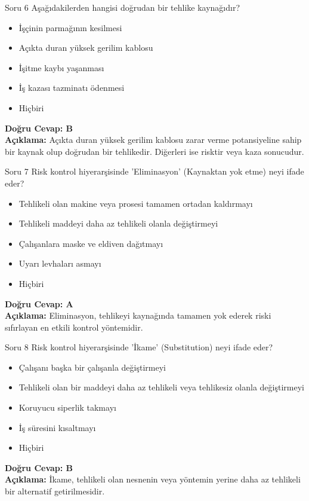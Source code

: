 \documentclass[12pt,a4paper]{article}
\begin{document}
\begin{testcard}{Soru 6}
    Aşağıdakilerden hangisi doğrudan bir tehlike kaynağıdır?
    \begin{itemize}
        \item[A)] İşçinin parmağının kesilmesi
        \item[B)] Açıkta duran yüksek gerilim kablosu
        \item[C)] İşitme kaybı yaşanması
        \item[D)] İş kazası tazminatı ödenmesi
        \item[E)] Hiçbiri
    \end{itemize}
    \tcblower
    \textbf{Doğru Cevap: B} \\
    \textbf{Açıklama:} Açıkta duran yüksek gerilim kablosu zarar verme potansiyeline sahip bir kaynak olup doğrudan bir tehlikedir. Diğerleri ise risktir veya kaza sonucudur.
\end{testcard}

\begin{testcard}{Soru 7}
    Risk kontrol hiyerarşisinde 'Eliminasyon' (Kaynaktan yok etme) neyi ifade eder?
    \begin{itemize}
        \item[A)] Tehlikeli olan makine veya prosesi tamamen ortadan kaldırmayı
        \item[B)] Tehlikeli maddeyi daha az tehlikeli olanla değiştirmeyi
        \item[C)] Çalışanlara maske ve eldiven dağıtmayı
        \item[D)] Uyarı levhaları asmayı
        \item[E)] Hiçbiri
    \end{itemize}
    \tcblower
    \textbf{Doğru Cevap: A} \\
    \textbf{Açıklama:} Eliminasyon, tehlikeyi kaynağında tamamen yok ederek riski sıfırlayan en etkili kontrol yöntemidir.
\end{testcard}

\begin{testcard}{Soru 8}
    Risk kontrol hiyerarşisinde 'İkame' (Substitution) neyi ifade eder?
    \begin{itemize}
        \item[A)] Çalışanı başka bir çalışanla değiştirmeyi
        \item[B)] Tehlikeli olan bir maddeyi daha az tehlikeli veya tehlikesiz olanla değiştirmeyi
        \item[C)] Koruyucu siperlik takmayı
        \item[D)] İş süresini kısaltmayı
        \item[E)] Hiçbiri
    \end{itemize}
    \tcblower
    \textbf{Doğru Cevap: B} \\
    \textbf{Açıklama:} İkame, tehlikeli olan nesnenin veya yöntemin yerine daha az tehlikeli bir alternatif getirilmesidir.
\end{testcard}
\end{document}

